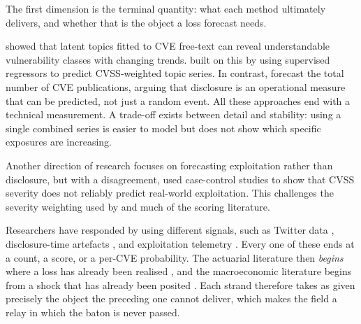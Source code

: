 \documentclass[review]{elsarticle}
\begin{document}
The first dimension is the terminal quantity: what each method ultimately delivers, and whether that is the object a loss forecast needs.



\citet{neuhaus2010} showed that latent topics fitted to CVE free-text can reveal understandable vulnerability classes with changing trends. \citet{kia2024} built on this by using supervised regressors to predict CVSS-weighted topic series. In contrast, \citet{leverett2020} forecast the total number of CVE publications, arguing that disclosure is an operational measure that can be predicted, not just a random event. All these approaches end with a technical measurement. A trade-off exists between detail and stability: using a single combined series is easier to model but does not show which specific exposures are increasing.



Another direction of research focuses on forecasting exploitation rather than disclosure, but with a disagreement, \citet{allodi2014} used case-control studies to show that CVSS severity does not reliably predict real-world exploitation. This challenges the severity weighting used by \citet{kia2024} and much of the scoring literature. 

Researchers have responded by using different signals, such as Twitter data \citep{sabottke2015}, disclosure-time artefacts \citep{suciu2022}, and exploitation telemetry \citep{jacobs2021,jacobs2023}. Every one of these ends at a count, a score, or a per-CVE probability. The actuarial literature then \emph{begins} where a loss has already been realised \citep{romanosky2016,eling2019}, and the macroeconomic literature begins from a shock that has already been posited \citep{welburn2022,eling2023,eisenbach2022}. Each strand therefore takes as given precisely the object the preceding one cannot deliver, which makes the field a relay in which the baton is never passed.
\end{document}
